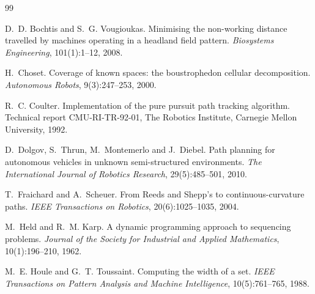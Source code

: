\renewcommand{\bibname}{References}
\begin{thebibliography}{99}

  D.~D. Bochtis and S.~G. Vougioukas.
  Minimising the non-working distance travelled by machines operating in a
  headland field pattern.
  \emph{Biosystems Engineering}, 101(1):1--12, 2008.

  H.~Choset.
  Coverage of known spaces: the boustrophedon cellular decomposition.
  \emph{Autonomous Robots}, 9(3):247--253, 2000.

  R.~C. Coulter.
  Implementation of the pure pursuit path tracking algorithm.
  Technical report CMU-RI-TR-92-01, The Robotics Institute, Carnegie Mellon
  University, 1992.

  D.~Dolgov, S.~Thrun, M.~Montemerlo and J.~Diebel.
  Path planning for autonomous vehicles in unknown semi-structured
  environments.
  \emph{The International Journal of Robotics Research}, 29(5):485--501,
  2010.

  T.~Fraichard and A.~Scheuer.
  From Reeds and Shepp's to continuous-curvature paths.
  \emph{IEEE Transactions on Robotics}, 20(6):1025--1035, 2004.

  M.~Held and R.~M. Karp.
  A dynamic programming approach to sequencing problems.
  \emph{Journal of the Society for Industrial and Applied Mathematics},
  10(1):196--210, 1962.

  M.~E. Houle and G.~T. Toussaint.
  Computing the width of a set.
  \emph{IEEE Transactions on Pattern Analysis and Machine Intelligence},
  10(5):761--765, 1988.

\end{thebibliography}
